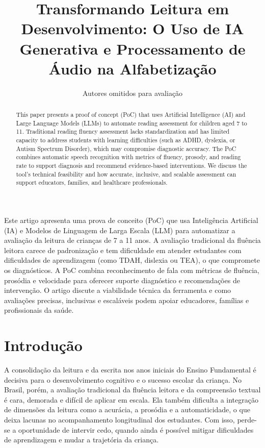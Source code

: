 \documentclass[12pt]{article}
\title{Transformando Leitura em Desenvolvimento: O Uso de IA Generativa e Processamento de Áudio na Alfabetização}
\author{Autores omitidos para avaliação\inst{1}}
\begin{document}
\maketitle

\begin{abstract}
This paper presents a proof of concept (PoC) that uses Artificial Intelligence (AI) and Large Language Models (LLMs) to automate reading assessment for children aged 7 to 11. Traditional reading fluency assessment lacks standardization and has limited capacity to address students with learning difficulties (such as ADHD, dyslexia, or Autism Spectrum Disorder), which may compromise diagnostic accuracy. The PoC combines automatic speech recognition with metrics of fluency, prosody, and reading rate to support diagnosis and recommend evidence-based interventions. We discuss the tool's technical feasibility and how accurate, inclusive, and scalable assessment can support educators, families, and healthcare professionals.
\end{abstract}

\begin{resumo}
Este artigo apresenta uma prova de conceito (PoC) que usa Inteligência Artificial (IA) e Modelos de Linguagem de Larga Escala (LLM) para automatizar a avaliação da leitura de crianças de 7 a 11 anos. A avaliação tradicional da fluência leitora carece de padronização e tem dificuldade em atender estudantes com dificuldades de aprendizagem (como TDAH, dislexia ou TEA), o que compromete os diagnósticos. A PoC combina reconhecimento de fala com métricas de fluência, prosódia e velocidade para oferecer suporte diagnóstico e recomendações de intervenção. O artigo discute a viabilidade técnica da ferramenta e como avaliações precisas, inclusivas e escaláveis podem apoiar educadores, famílias e profissionais da saúde.
\end{resumo}


\section{Introdução}

A consolidação da leitura e da escrita nos anos iniciais do Ensino Fundamental é decisiva para o desenvolvimento cognitivo e o sucesso escolar da criança. No Brasil, porém, a avaliação tradicional da fluência leitora e da compreensão textual é cara, demorada e difícil de aplicar em escala. Ela também dificulta a integração de dimensões da leitura como a acurácia, a prosódia e a automaticidade, o que deixa lacunas no acompanhamento longitudinal dos estudantes. Com isso, perde-se a oportunidade de intervir cedo, quando ainda é possível mitigar dificuldades de aprendizagem e mudar a trajetória da criança.
\end{document}
